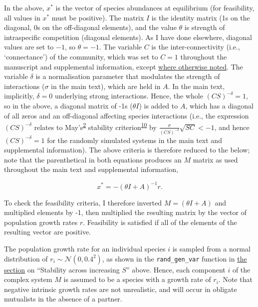 \documentclass[]{article}
\begin{document}
In the above, \(x^{*}\) is the vector of species abundances at
equilibrium (for feasibility, all values in \(x^{*}\) must be positive).
The matrix \(I\) is the identity matrix (1s on the diagonal, 0s on the
off-diagonal elements), and the value \(\theta\) is strength of
intraspecific competition (diagonal elements). As I have done elsewhere,
diagonal values are set to \(-1\), so \(\theta = -1\). The variable
\(C\) is the inter-connectivity (i.e., `connectance') of the community,
which was set to \(C = 1\) throughout the manuscript and supplemental
information, except \protect\hyperlink{connectance}{where otherwise
noted}. The variable \(\delta\) is a normalisation parameter that
modulates the strength of interactions (\(\sigma\) in the main text),
which are held in \(A\). In the main text, implicitly, \(\delta = 0\)
underlying strong interactions. Hence, the whole \((CS)^{-\delta} = 1\),
so in the above, a diagonal matrix of -1s (\(\theta I\)) is added to
\(A\), which has a diagonal of all zeros and an off-diagonal affecting
species interactions (i.e., the expression \((CS)^{-\delta}\) relates to
May's\textsuperscript{\protect\hyperlink{ref-May1972}{2}} stability
criterion\textsuperscript{\protect\hyperlink{ref-Dougoud2018}{10}} by
\(\frac{\sigma}{(CS)^{-\delta}}\sqrt{SC} < -1\), and hence
\((CS)^{-\delta} = 1\) for the randomly simulated systems in the main
text and supplemental information). The above criteria is therefore
reduced to the below; note that the parenthetical in both equations
produces an \(M\) matrix as used throughout the main text and
supplemental information,

\[x^{*} = -\left(\theta I + A\right)^{-1}r.\]

To check the feasibility criteria, I therefore inverted
\(M = (\theta I + A)\) and multiplied elements by -1, then multiplied
the resulting matrix by the vector of population growth rates \(r\).
Feasibility is satisfied if all of the elements of the resulting vector
are positive.

The population growth rate for an individual species \(i\) is sampled
from a normal distribution of \(r_{i} \sim \mathcal{N}(0, 0.4^{2})\), as
shown in the \texttt{rand\_gen\_var} function in
\protect\hyperlink{IncrS}{the section} on ``Stability across increasing
\(S\)'' above. Hence, each component \(i\) of the complex system \(M\)
is assumed to be a species with a growth rate of \(r_{i}\). Note that
negative intrinsic growth rates are not unrealistic, and will occur in
obligate mutualists in the absence of a partner.
\end{document}
